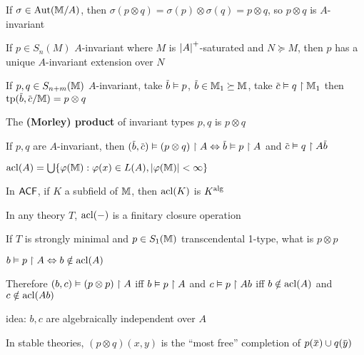 \documentclass[11pt]{article}
\begin{document}
If \(\sigma\in\operatorname{\text{Aut}}(\mathbb{M}/A)\), then \(\sigma(p\otimes q)=\sigma(p)\otimes\sigma(q)=p\otimes q\), so \(p\otimes q\) is \(A\)-invariant

\begin{fact}[]
If \(p\in S_n(M)\) \(A\)-invariant where \(M\) is \(\abs{A}^+\)-saturated and \(N\succeq M\), then \(p\)
has a unique \(A\)-invariant extension over \(N\)
\end{fact}

\begin{fact}[]
If \(p,q\in S_{n+m}(\mathbb{M})\) \(A\)-invariant, take \(\barb\vDash p\), \(\barb\in\M_1\succeq\M\),
take \(\barc\vDash q\uhr\M_1\) then \(\tp(\barb,\barc/\M)=p\otimes q\)
\end{fact}

\begin{definition}[]
The \textbf{(Morley) product} of invariant types \(p,q\) is \(p\otimes q\)
\end{definition}

If \(p,q\) are \(A\)-invariant, then \((\barb,\barc)\vDash(p\otimes q)\uhr A\Leftrightarrow\barb\vDash p\uhr A\)
and \(\barc\vDash q\uhr A\barb\)

\begin{definition}[]
\(\acl(A)=\bigcup\{\varphi(\M):\varphi(x)\in L(A),\abs{\varphi(\M)}<\infty\}\)
\end{definition}

\begin{fact}[]
In \(\textsf{ACF}\), if \(K\) a subfield of \(\mathbb{M}\), then \(\operatorname{acl}(K)\) is \(K^{\operatorname{\text{alg}}}\)
\end{fact}

\begin{fact}[]
In any theory \(T\), \(\operatorname{acl}(-)\) is a finitary closure operation
\end{fact}

\begin{examplle}[]
If \(T\) is strongly minimal and \(p\in S_1(\mathbb{M})\) transcendental 1-type, what is \(p\otimes p\)

\(b\vDash p\upharpoonright A\Leftrightarrow b\notin\operatorname{acl}(A)\)

Therefore \((b,c)\vDash(p\otimes p)\upharpoonright A\) iff \(b\vDash p\upharpoonright A\) and \(c\vDash p\upharpoonright Ab\)
iff \(b\notin\operatorname{acl}(A)\) and \(c\notin\operatorname{acl}(Ab)\)

idea: \(b,c\) are algebraically independent over \(A\)
\end{examplle}

In stable theories, \((p\otimes q)(x,y)\) is the ``most free'' completion of \(p(\barx)\cup q(\bary)\)
\end{document}
